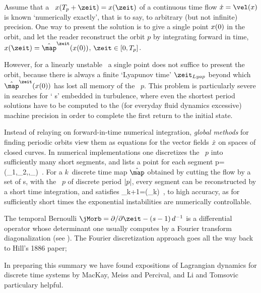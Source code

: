 \bigskip

Assume that a \po\ $\ssp(\period{p}+\zeit)=\ssp(\zeit)$ of a continuous
time flow
\(
\dot{\ssp}=\vel(\ssp)
\)
is known `numerically exactly', that is to say, to arbitrary (but not
infinite) precision. One way to present the solution is to give a single
point $x(0)$ in the orbit, and let the reader reconstruct the orbit
$p$ by integrating forward in time,
$\ssp(\zeit)=\hat{\map}^\zeit(\ssp(0))$, $\zeit\in[0,\period{p}]$.

However, for a linearly unstable \po\ a single point does not suffice to
present the orbit, because there is always a finite `Lyapunov time'
$\zeit_{Lyap}$  beyond which $\hat{\map}^\zeit(\ssp(0))$ has lost all memory of
the \po\ $p$. This problem is particularly severe in searches for {`\ecs
s'} embedded in turbulence, where even the shortest period solutions have
to be computed to the (for everyday fluid dynamics excessive) machine
precision in order to complete the
first return to the initial state.

Instead of relaying on for\-ward-in-time numerical integration,
\emph{global methods} for finding periodic orbits view them
as equations for the vector fields $\dot{x}$ on spaces of closed
curves. In numerical implementations one discretizes the \po\  $p$ into
sufficiently many short
segments, and lists a
point for each segment
\beq
p=(\ssp_1,\ssp_2,\cdots,\ssp_)
\,.
For a $k$\dmn\ discrete time map $\hat{\map}$ obtained by cutting the flow by a
set of {\PoincSec s}, with the \po\ $p$ of discrete period ${|p|}$,
every segment can be reconstructed by a short time integration, and
satisfies
\beq
\ssp_{k+1}=\hat{\map}(\ssp_k)
\,,
to high accuracy, as for sufficiently short times the exponential
instabilities are numerically controllable.


\bigskip

The temporal Bernoulli {\jacobianOrb} %
$\jMorb=\partial/\partial\zeit-(s-1)\,\shift^{-1}$ is a differential
operator whose determinant one usually computes by a Fourier transform
diagonalization (see ). The Fourier discretization
approach goes all the way back to Hill's 1886 paper;


\bigskip

In preparing this summary we have found expositions of Lagrangian
dynamics for discrete time systems by MacKay, Meiss and
Percival, and Li and Tomsovic particulary
helpful.

